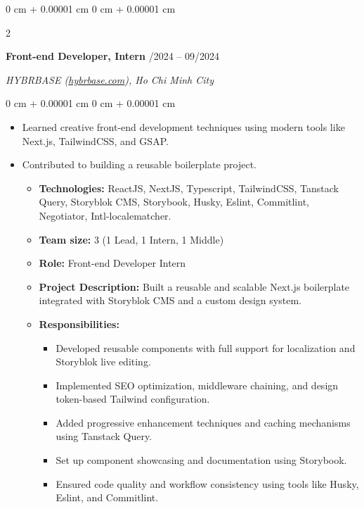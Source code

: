 \documentclass[10pt, letterpaper]{article}
\newenvironment{highlights}{
    \begin{itemize}[
        topsep=0.10 cm,
        parsep=0.10 cm,
        partopsep=0pt,
        itemsep=0pt,
        leftmargin=0 cm + 10pt
    ]
}{
    \end{itemize}
} %
\newenvironment{onecolentry}{
    \begin{adjustwidth}{
        0 cm + 0.00001 cm
    }{
        0 cm + 0.00001 cm
    }
}{
    \end{adjustwidth}
} %
\newenvironment{twocolentry}[2][]{
    \onecolentry
    \def\secondColumn{#2}
    \setcolumnwidth{\fill, 4.5 cm}
    \begin{paracol}{2}
}{
    \switchcolumn \raggedleft \secondColumn
    \end{paracol}
    \endonecolentry
} %
\begin{document}
        \vspace{0.2 cm}
        \begin{twocolentry}{
            06/2024 – 09/2024
        }
        \textbf{Front-end Developer, Intern}\end{twocolentry}
        \vspace{0.10 cm}
        \par{\textit{{HYBRBASE (\href{https://hybrbase.com/}{hybrbase.com})}, Ho Chi Minh City}}
        \vspace{0.10 cm}
        \begin{onecolentry}
            \begin{highlights}
                \item Learned creative front-end development techniques using modern tools like Next.js, TailwindCSS, and GSAP.
                \item Contributed to building a reusable boilerplate project.
                \begin{itemize}
                    \item {\bf Technologies:} ReactJS, NextJS, Typescript, TailwindCSS, Tanstack Query, Storyblok CMS, Storybook, Husky, Eslint, Commitlint, Negotiator, Intl-localematcher.
                    \item {\bf Team size:} 3 (1 Lead, 1 Intern, 1 Middle)
                    \item {\bf Role:} Front-end Developer Intern
                    \item {\bf Project Description:} Built a reusable and scalable Next.js boilerplate integrated with Storyblok CMS and a custom design system.
                    \item {\bf Responsibilities:}
                    \begin{itemize}
                        \item Developed reusable components with full support for localization and Storyblok live editing.
                        \item Implemented SEO optimization, middleware chaining, and design token-based Tailwind configuration.
                        \item Added progressive enhancement techniques and caching mechanisms using Tanstack Query.
                        \item Set up component showcasing and documentation using Storybook.
                        \item Ensured code quality and workflow consistency using tools like Husky, Eslint, and Commitlint.
                    \end{itemize}
                \end{itemize}
            \end{highlights}
        \end{onecolentry}
\end{document}
